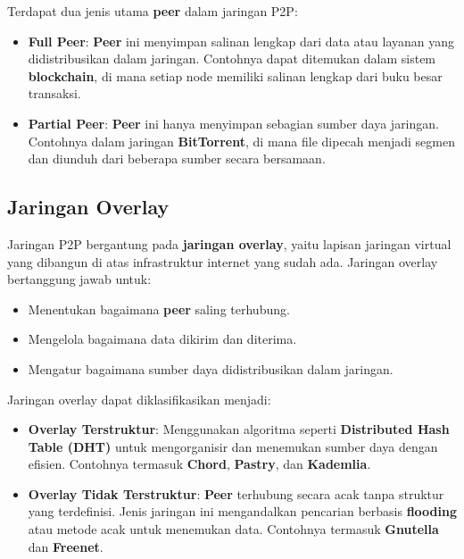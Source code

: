 Terdapat dua jenis utama \textbf{peer} dalam jaringan P2P:
\begin{itemize}
	\item \textbf{Full Peer}: \textbf{Peer} ini menyimpan salinan lengkap dari data atau layanan yang didistribusikan dalam jaringan. Contohnya dapat ditemukan dalam sistem \textbf{blockchain}, di mana setiap node memiliki salinan lengkap dari buku besar transaksi.
	\item \textbf{Partial Peer}: \textbf{Peer} ini hanya menyimpan sebagian sumber daya jaringan. Contohnya dalam jaringan \textbf{BitTorrent}, di mana file dipecah menjadi segmen dan diunduh dari beberapa sumber secara bersamaan.
\end{itemize}

\subsection{Jaringan Overlay}
Jaringan P2P bergantung pada \textbf{jaringan overlay}, yaitu lapisan jaringan virtual yang dibangun di atas infrastruktur internet yang sudah ada. Jaringan overlay bertanggung jawab untuk:
\begin{itemize}
	\item Menentukan bagaimana \textbf{peer} saling terhubung.
	\item Mengelola bagaimana data dikirim dan diterima.
	\item Mengatur bagaimana sumber daya didistribusikan dalam jaringan.
\end{itemize}

Jaringan overlay dapat diklasifikasikan menjadi:
\begin{itemize}
	\item \textbf{Overlay Terstruktur}: Menggunakan algoritma seperti \textbf{Distributed Hash Table (DHT)} untuk mengorganisir dan menemukan sumber daya dengan efisien. Contohnya termasuk \textbf{Chord}, \textbf{Pastry}, dan \textbf{Kademlia}.
	\item \textbf{Overlay Tidak Terstruktur}: \textbf{Peer} terhubung secara acak tanpa struktur yang terdefinisi. Jenis jaringan ini mengandalkan pencarian berbasis \textbf{flooding} atau metode acak untuk menemukan data. Contohnya termasuk \textbf{Gnutella} dan \textbf{Freenet}.
\end{itemize}

